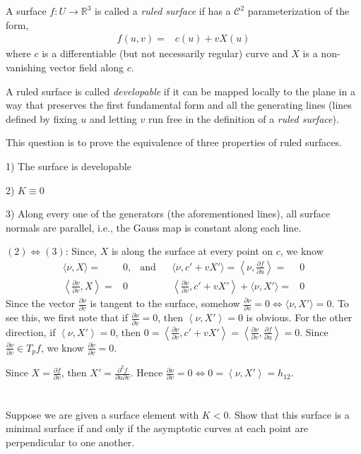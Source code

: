 \documentclass[12pt]{amsart}
\newcommand{\parti}[2]{\frac{\partial #1}{\partial #2}}
\newcommand{\inn}[1]{\left\langle #1\right\rangle}
\begin{document}
\section{}
A surface $f:U\to\mathbb{R}^3$ is called a \textit{ruled surface} if has a $\mathcal{C}^2$ parameterization of the form,
\begin{align*}
	f(u,v)=&c(u)+vX(u)
\end{align*}
where $c$ is a differentiable (but not necessarily regular) curve and $X$ is a non-vanishing vector field along $c$.
\par
A ruled surface is called \textit{developable} if it can be mapped locally to the plane in a way that preserves the first fundamental form and all the generating lines (lines defined by fixing $u$ and letting $v$ run free in the definition of a \textit{ruled surface}).
\par This question is to prove the equivalence of three properties of ruled surfaces.
\par 1) The surface is developable
\par 2) $K\equiv0$
\par 3) Along every one of the generators (the aforementioned lines), all surface normals are parallel, i.e., the Gauss map is constant along each line.
\newline
\par $(2)\iff(3)$: Since, $X$ is along the surface at every point on $c$, we know
\begin{align*}
	\langle\nu,X\rangle=&0, & \text{and}& & \langle\nu,c'+vX'\rangle=\left\langle\nu,\frac{\partial f}{\partial u}\right\rangle=&0
	\\\left\langle\frac{\partial\nu}{\partial v},X\right\rangle=&0 & & & \inn{\parti{\nu}{v},c'+vX'}+\langle\nu,X'\rangle=&0
\end{align*}
Since the vector $\parti{\nu}{v}$ is tangent to the surface, somehow $\parti{\nu}{v}=0\iff\langle\nu,X'\rangle=0$. To see this, we first note that if $\parti{\nu}{v}=0$, then $\inn{\nu,X'}=0$ is obvious. For the other direction, if $\inn{\nu,X'}=0$, then $0=\inn{\parti{\nu}{v},c'+vX'}=\inn{\parti{\nu}{v},\parti{f}{u}}=0$. Since $\parti{\nu}{v}\in T_pf$, we know $\parti{\nu}{v}=0$.
\par Since $X=\parti{f}{v}$, then $X'=\frac{\partial^2f}{\partial u\partial v}$. Hence $\parti{\nu}{v}=0\iff0=\inn{\nu,X'}=h_{12}$.

\newpage
\section{}Suppose we are given a surface element with $K<0$. Show that this surface is a minimal surface if and only if the asymptotic curves at each point are perpendicular to one another.
\end{document}
